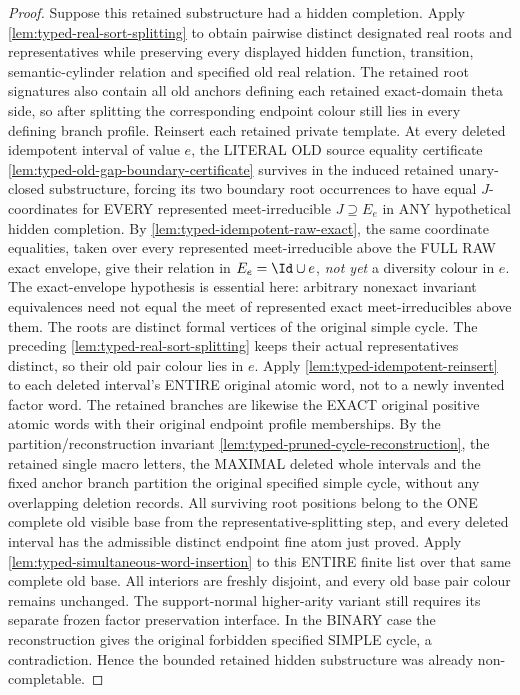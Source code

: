 \begin{proof}
Suppose this retained substructure had a hidden completion.  Apply
\cref{lem:typed-real-sort-splitting} to obtain pairwise distinct designated
real roots and representatives while preserving every displayed hidden
function, transition, semantic-cylinder relation and specified old real
relation.  The retained root signatures also contain all old anchors defining
each retained exact-domain theta side, so after splitting the corresponding
endpoint colour still lies in every defining branch profile.  Reinsert each
retained private template.  At every deleted idempotent interval
of value \(e\), the LITERAL
OLD source equality certificate
\cref{lem:typed-old-gap-boundary-certificate}
survives in the induced
retained unary-closed substructure,
forcing its two boundary
root occurrences to have equal
\(J\)-coordinates for EVERY
represented meet-irreducible
\(J\supseteq E_e\) in ANY
hypothetical hidden completion. By \cref{lem:typed-idempotent-raw-exact},
the same coordinate equalities, taken
over every represented meet-irreducible
above the FULL RAW exact envelope,
give their relation in \(E_e=\Id\cup e\),
\emph{not yet} a diversity colour in \(e\).
The exact-envelope hypothesis is
essential here: arbitrary nonexact
invariant equivalences need not equal
the meet of represented exact
meet-irreducibles above them.
The roots are distinct formal vertices of the
original simple cycle. The preceding
\cref{lem:typed-real-sort-splitting}
keeps their actual representatives distinct,
so their old pair colour lies in \(e\).
Apply \cref{lem:typed-idempotent-reinsert}
to each deleted interval's ENTIRE
original atomic word, not to a
newly invented factor word.
The retained branches are likewise
the EXACT original positive atomic
words with their original endpoint
profile memberships.
By the partition/reconstruction
invariant
\cref{lem:typed-pruned-cycle-reconstruction},
the retained single macro letters,
the MAXIMAL deleted whole intervals
and the fixed anchor branch
partition the original specified
simple cycle, without any
overlapping deletion records.
All surviving root positions
belong to the ONE complete
old visible base from the
representative-splitting step,
and every deleted interval
has the admissible distinct
endpoint fine atom just proved.
Apply
\cref{lem:typed-simultaneous-word-insertion}
to this ENTIRE finite list over
that same complete old base.
All interiors are freshly
disjoint, and every old
base pair colour remains
unchanged. The support-normal
higher-arity variant still
requires its separate
frozen factor preservation
interface. In the BINARY case
the reconstruction gives the
original forbidden specified
SIMPLE cycle, a contradiction.  Hence the bounded retained hidden substructure was already
non-completable.
\end{proof}


